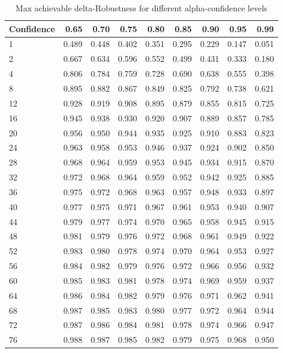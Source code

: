 \begin{table}
\centering
\caption{Max achievable delta-Robustness for different alpha-confidence levels}
\label{tab:maxdelta}
\begin{tabular}{lrrrrrrrr}
\toprule
Confidence &  0.65 &  0.70 &  0.75 &  0.80 &  0.85 &  0.90 &  0.95 &  0.99 \\
\midrule
1   & 0.489 & 0.448 & 0.402 & 0.351 & 0.295 & 0.229 & 0.147 & 0.051 \\
2   & 0.667 & 0.634 & 0.596 & 0.552 & 0.499 & 0.431 & 0.333 & 0.180 \\
4   & 0.806 & 0.784 & 0.759 & 0.728 & 0.690 & 0.638 & 0.555 & 0.398 \\
8   & 0.895 & 0.882 & 0.867 & 0.849 & 0.825 & 0.792 & 0.738 & 0.621 \\
12  & 0.928 & 0.919 & 0.908 & 0.895 & 0.879 & 0.855 & 0.815 & 0.725 \\
16  & 0.945 & 0.938 & 0.930 & 0.920 & 0.907 & 0.889 & 0.857 & 0.785 \\
20  & 0.956 & 0.950 & 0.944 & 0.935 & 0.925 & 0.910 & 0.883 & 0.823 \\
24  & 0.963 & 0.958 & 0.953 & 0.946 & 0.937 & 0.924 & 0.902 & 0.850 \\
28  & 0.968 & 0.964 & 0.959 & 0.953 & 0.945 & 0.934 & 0.915 & 0.870 \\
32  & 0.972 & 0.968 & 0.964 & 0.959 & 0.952 & 0.942 & 0.925 & 0.885 \\
36  & 0.975 & 0.972 & 0.968 & 0.963 & 0.957 & 0.948 & 0.933 & 0.897 \\
40  & 0.977 & 0.975 & 0.971 & 0.967 & 0.961 & 0.953 & 0.940 & 0.907 \\
44  & 0.979 & 0.977 & 0.974 & 0.970 & 0.965 & 0.958 & 0.945 & 0.915 \\
48  & 0.981 & 0.979 & 0.976 & 0.972 & 0.968 & 0.961 & 0.949 & 0.922 \\
52  & 0.983 & 0.980 & 0.978 & 0.974 & 0.970 & 0.964 & 0.953 & 0.927 \\
56  & 0.984 & 0.982 & 0.979 & 0.976 & 0.972 & 0.966 & 0.956 & 0.932 \\
60  & 0.985 & 0.983 & 0.981 & 0.978 & 0.974 & 0.969 & 0.959 & 0.937 \\
64  & 0.986 & 0.984 & 0.982 & 0.979 & 0.976 & 0.971 & 0.962 & 0.941 \\
68  & 0.987 & 0.985 & 0.983 & 0.980 & 0.977 & 0.972 & 0.964 & 0.944 \\
72  & 0.987 & 0.986 & 0.984 & 0.981 & 0.978 & 0.974 & 0.966 & 0.947 \\
76  & 0.988 & 0.987 & 0.985 & 0.982 & 0.979 & 0.975 & 0.968 & 0.950 \\

\end{tabular}
\end{table}
